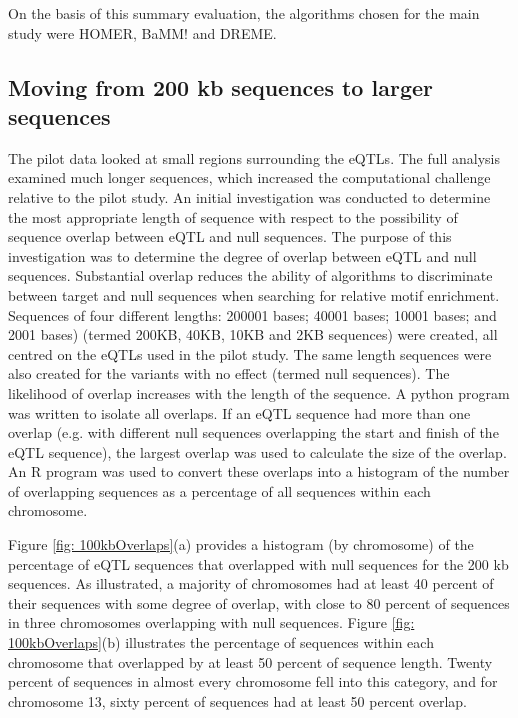 \documentclass[12pt]{article}
\begin{document}
On the basis of this summary evaluation, the algorithms chosen for the main study were HOMER, BaMM! and DREME.


\subsection{Moving from 200 kb sequences to larger sequences}

The pilot data looked at small regions surrounding the eQTLs. The full analysis examined much longer sequences, which increased the computational challenge relative to the pilot study.  An initial investigation was conducted to determine the most appropriate length of sequence with respect to the possibility of sequence overlap between eQTL and null sequences. The purpose of this investigation was to determine the degree of overlap between eQTL and null sequences. Substantial overlap reduces the ability of algorithms to discriminate between target and null sequences when searching for relative motif enrichment. Sequences of four different lengths: 200001 bases; 40001 bases; 10001 bases; and 2001 bases) (termed 200KB, 40KB, 10KB and 2KB sequences) were created, all centred on the eQTLs used in the pilot study. The same length sequences were also created for the variants with no effect (termed null sequences). The likelihood of overlap increases with the length of the sequence. A python program was written to isolate all overlaps. If an eQTL sequence had more than one overlap (e.g. with different null sequences overlapping the start and finish of the eQTL sequence), the largest overlap was used to calculate the size of the overlap. An R program was used to convert these overlaps into a histogram of the number of overlapping sequences as a percentage of all sequences within each chromosome.

Figure \ref{fig: 100kbOverlaps}(a) provides a histogram (by chromosome) of the percentage of eQTL sequences that overlapped with null sequences for the 200 kb sequences. As illustrated, a majority of chromosomes had at least 40 percent of their sequences with some degree of overlap, with close to 80 percent of sequences in three chromosomes overlapping with null sequences. Figure \ref{fig: 100kbOverlaps}(b) illustrates the percentage of sequences within each chromosome that overlapped by at least 50 percent of sequence length. Twenty percent of sequences in almost every chromosome fell into this category, and for chromosome 13, sixty percent of sequences had at least 50 percent overlap.
\end{document}
